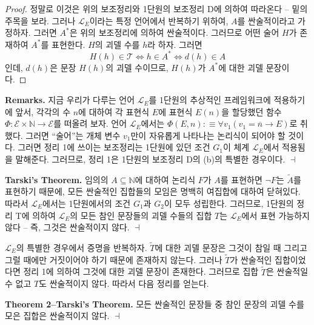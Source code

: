 \documentclass[12pt]{paper}
\newenvironment{context}[1][]{\noindent \textbf{{#1}.}}{\hfill $ \dashv $}
\begin{document}
  \begin{proof}
    정말로 이것은 위의 보조정리와 1단원의 보조정리 D에 의하여 따라온다 -- 밑의 주목을 보라.
    그러나 $\mathcal{L}_{E}$이라는 특정 언어에서 반복하기 위하여, $A$를 싼술적이라고 가정하자.
    그러면 $A^{*}$은 위의 보조정리에 의하여 싼술적이다.
    그러므로 어떤 술어 $H$가 존재하여 $A^{*}$를 표현한다.
    $H$의 괴델 수를 $h$라 하자.
    그러면 $$H \left( h \right) \in \mathcal{T} \iff h \in A^{*} \iff d \left( h \right) \in A$$인데,
    $d \left( h \right)$은 문장 $H \left( h \right)$의 괴델 수이므로,
    $H \left( h \right)$가 $A^{*}$에 대한 괴델 문장이다.
  \end{proof}

  \begin{context}[Remarks]
    지금 우리가 다루는 언어 $\mathcal{L}_{E}$를 1단원의 추상적인 프레임워크에 적용하기에 앞서,
    각각의 수 $n$에 대하여 각 표현식 $E$에 표현식 $E \left( n \right)$을 할당했던 함수 $\Phi : \mathcal{E} \times \mathbb{N} \to \mathcal{E}$를 떠올려 보자.
    언어 $\mathcal{L}_{E}$에서는 $\Phi \left( E , n \right) : \equiv \forall v_1 \left( v_1 = \overline{n} \rightarrow E \right)$로 취했다.
    그러면 ``술어''는 개체 변수 $v_1$만이 자유롭게 나타나는 논리식이 되어야 할 것이다.
    그러면 정리 1에 쓰이는 보조정리는 1단원에 있던 조건 $G_1$이 체계 $\mathcal{L}_{E}$에서 적용됨을 말해준다.
    그러므로, 정리 1은 1단원의 보조정리 D의 (b)의 특별한 경우이다.
  \end{context}

  \begin{context}[Tarski's Theorem]
    임의의 $A \subseteq \mathbb{N}$에 대하여 논리식 $F$가 $A$를 표현하면 $\lnot F$는 $\tilde{A}$를 표현하기 때문에,
    모든 싼술적인 집합들의 모임은 명백히 여집합에 대하여 닫혀있다.
    따라서 $\mathcal{L}_{E}$에서는 1단원에서의 조건 $G_1$과 $G_2$이 모두 성립한다.
    그러므로, 1단원의 정리 T에 의하여 $\mathcal{L}_{E}$의 모든 참인 문장들의 괴델 수들의 집합 $T$는 $\mathcal{L}_{E}$에서 표현 가능하지 않다 --
    즉, 그것은 싼술적이지 않다.
  \end{context}

  $\mathcal{L}_{E}$의 특별한 경우에서 증명을 반복하자.
  $\tilde{T}$에 대한 괴델 문장은 그것이 참일 때 그리고 그럴 때에만 거짓이어야 하기 때문에 존재하지 않는다.
  그러나 $\tilde{T}$가 싼술적인 집합이었다면 정리 1에 의하여 그것에 대한 괴델 문장이 존재한다.
  그러므로 집합 $\tilde{T}$은 싼술적일 수 없고 $T$도 싼술적이지 않다.
  따라서 다음 정리를 얻는다.

  \begin{context}[Theorem 2--Tarski's Theorem]
    모든 싼술적인 문장들 중 참인 문장의 괴델 수를 모은 집합은 싼술적이지 않다.
  \end{context}
\end{document}
